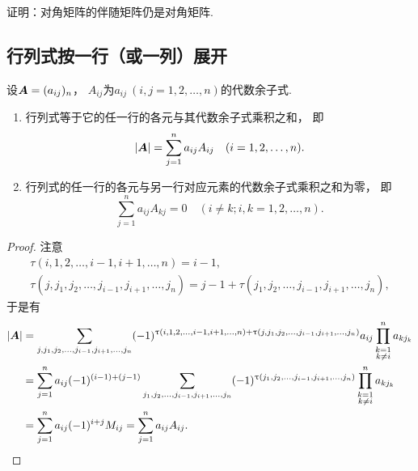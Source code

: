 \begin{example}
证明：对角矩阵的伴随矩阵仍是对角矩阵.
\end{example}

\subsection{行列式按一行（或一列）展开}
\begin{theorem}\label{theorem:行列式.行列式按行展开}
设\(\boldsymbol{A}=(a_{ij})_n\)，
\(A_{ij}\)为\(a_{ij}\ (i,j=1,2,\dotsc,n)\)的代数余子式.
\begin{enumerate}
	\item 行列式等于它的任一行的各元与其代数余子式乘积之和，
	即\begin{equation}
		\abs{\boldsymbol{A}} = \sum_{j=1}^n a_{ij} A_{ij}
		\quad(i=1,2,\dotsc,n).
	\end{equation}

	\item 行列式的任一行的各元与另一行对应元素的代数余子式乘积之和为零，
	即\begin{equation}
		\sum_{j=1}^n a_{ij} A_{kj} = 0
		\quad(i \neq k;
		i,k=1,2,\dotsc,n).
	\end{equation}
\end{enumerate}
\begin{proof}
注意\begin{gather*}
	\tau(i,1,2,\dotsc,i-1,i+1,\dotsc,n) = i-1, \\
	\tau(j,j_1,j_2,\dotsc,j_{i-1},j_{i+1},\dotsc,j_n)
	= j-1+\tau(j_1,j_2,\dotsc,j_{i-1},j_{i+1},\dotsc,j_n),
\end{gather*}
于是有\begin{align*}
	\abs{\boldsymbol{A}}
	&= \sum_{j,j_1,j_2,\dotsc,j_{i-1},j_{i+1},\dotsc,j_n}
		(-1)^{\uptau(i,1,2,\dotsc,i-1,i+1,\dotsc,n) + \uptau(j,j_1,j_2,\dotsc,j_{i-1},j_{i+1},\dotsc,j_n)}
		a_{ij} \prod_{\substack{k=1 \\ k \neq i}}^n a_{k j_k} \\
	&= \sum_{j=1}^n a_{ij} (-1)^{(i-1)+(j-1)}
		\sum_{j_1,j_2,\dotsc,j_{i-1},j_{i+1},\dotsc,j_n}
			(-1)^{\uptau(j_1,j_2,\dotsc,j_{i-1},j_{i+1},\dotsc,j_n)}
				\prod_{\substack{k=1 \\ k \neq i}}^n a_{k j_k} \\
	&= \sum_{j=1}^n a_{ij} (-1)^{i+j} M_{ij}
	= \sum_{j=1}^n a_{ij} A_{ij}.
	\qedhere
\end{align*}
\end{proof}
\end{theorem}


